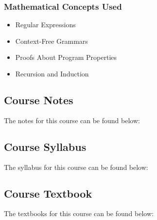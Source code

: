 {\begin{highlight}[\CSPBPPL]
        \subsubsection*{Mathematical Concepts Used}
        
        \begin{itemize}
            \item Regular Expressions
            \item Context-Free Grammars
            \item Proofs About Program Properties
            \item Recursion and Induction
        \end{itemize}
    \end{highlight}
}

\subsection{Course Notes}

The notes for this course can be found below: \coursedoc{\CSPBPPLCourseNotes}

\subsection{Course Syllabus}

The syllabus for this course can be found below: \coursedoc{\CSPBPPLSyllabus}

\subsection{Course Textbook}

The textbooks for this course can be found below: \coursedoc{\CSPBAtomicScalaTextbook} \coursedoc{\CSPBEssenPPLTextbook} \coursedoc{\CSPBFuncProgTextbook} \coursedoc{\CSPBProgInScalTextbook}